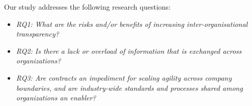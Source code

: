 Our study %
addresses the following research questions:

%

\begin{itemize}
\item {\em RQ1: What are the risks and/or benefits of increasing inter-organisational transparency?}
\item {\em RQ2: Is there a lack or overload of information that is exchanged across organizations?} 
\item {\em RQ3: Are contracts an impediment for scaling agility across company boundaries, and 
are industry-wide standards and processes shared among organizations an enabler?} 
\end{itemize}

